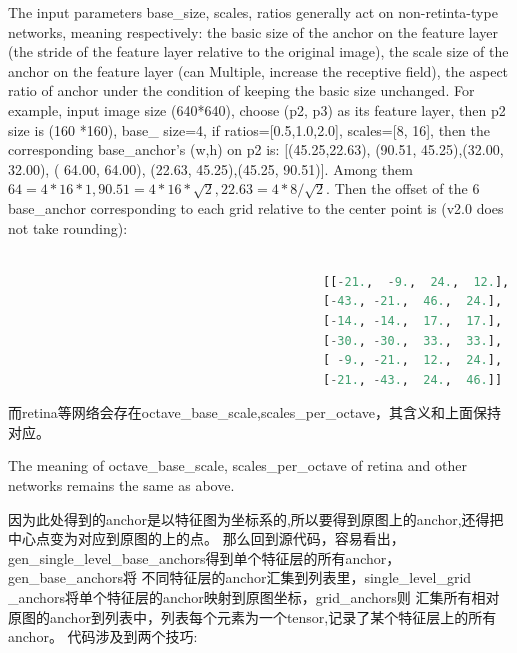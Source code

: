 \documentclass[UTF8]{ctexart}
\begin{document}
 The input parameters base\_size, scales, ratios generally act on non-retinta-type networks, meaning 
 respectively: the basic size of the anchor on the feature layer (the stride of the feature layer 
 relative to the original image), the scale size of the anchor on the feature layer (can Multiple, 
 increase the receptive field), the aspect ratio of anchor under the condition of keeping the basic 
 size unchanged. For example, input image size (640*640), choose (p2, p3) as its feature layer, 
 then p2 size is (160 *160), base\_ size=4, if ratios=[0.5,1.0,2.0], scales=[8, 16], then the 
 corresponding base\_anchor's (w,h) on p2 is: [(45.25,22.63), (90.51, 45.25),(32.00, 32.00), (
64.00, 64.00), (22.63, 45.25),(45.25, 90.51)]. Among them 
$64=4*16*1,90.51=4 *16*\sqrt{2}, 22.63=4*8/\sqrt{2}.$ Then the offset of the 6 
base\_anchor corresponding to each grid relative to the center point is (v2.0 does not take rounding):

\lstset{style=mystyle}
\begin{lstlisting}[language=Python]
	
											[[-21.,  -9.,  24.,  12.],
											[-43., -21.,  46.,  24.],
											[-14., -14.,  17.,  17.],
											[-30., -30.,  33.,  33.],
											[ -9., -21.,  12.,  24.],
											[-21., -43.,  24.,  46.]]

\end{lstlisting}

而retina等网络会存在octave\_base\_scale,scales\_per\_octave，其含义和上面保持对应。

The meaning of octave\_base\_scale, scales\_per\_octave of retina and other networks remains the same as above.

因为此处得到的anchor是以特征图为坐标系的,所以要得到原图上的anchor,还得把中心点变为对应到原图的上的点。
那么回到源代码，容易看出，gen\_single\_level\_base\_anchors得到单个特征层的所有anchor，gen\_base\_anchors将
不同特征层的anchor汇集到列表里，single\_level\_grid
\_anchors将单个特征层的anchor映射到原图坐标，grid\_anchors则
汇集所有相对原图的anchor到列表中，列表每个元素为一个tensor,记录了某个特征层上的所有anchor。
代码涉及到两个技巧:
\end{document}
